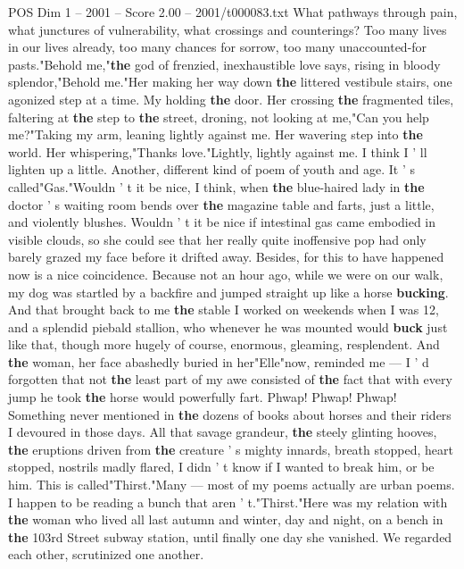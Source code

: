 \begin{textsample}{POS Dim 1 – 2001 – Score 2.00 – 2001/t000083.txt}
What pathways through pain, what junctures of vulnerability, what crossings and counterings?
Too many lives in our lives already, too many chances for sorrow, too many unaccounted-for pasts."Behold me,"\textbf{the} god of frenzied, inexhaustible love says, rising in bloody splendor,"Behold me."Her making her way down \textbf{the} littered vestibule stairs, one agonized step at a time.
My holding \textbf{the} door.
Her crossing \textbf{the} fragmented tiles, faltering at \textbf{the} step to \textbf{the} street, droning, not looking at me,"Can you help me?"Taking my arm, leaning lightly against me.
Her wavering step into \textbf{the} world.
Her whispering,"Thanks love."Lightly, lightly against me.
I think I ' ll lighten up a little.
Another, different kind of poem of youth and age.
It ' s called"Gas."Wouldn ' t it be nice, I think, when \textbf{the} blue-haired lady in \textbf{the} doctor ' s waiting room bends over \textbf{the} magazine table and farts, just a little, and violently blushes.
Wouldn ' t it be nice if intestinal gas came embodied in visible clouds, so she could see that her really quite inoffensive pop had only barely grazed my face before it drifted away.
Besides, for this to have happened now is a nice coincidence.
Because not an hour ago, while we were on our walk, my dog was startled by a backfire and jumped straight up like a horse \textbf{bucking}.
And that brought back to me \textbf{the} stable I worked on weekends when I was 12, and a splendid piebald stallion, who whenever he was mounted would \textbf{buck} just like that, though more hugely of course, enormous, gleaming, resplendent.
And \textbf{the} woman, her face abashedly buried in her"Elle"now, reminded me — I ' d forgotten that not \textbf{the} least part of my awe consisted of \textbf{the} fact that with every jump he took \textbf{the} horse would powerfully fart.
Phwap!
Phwap!
Phwap!
Something never mentioned in \textbf{the} dozens of books about horses and their riders I devoured in those days.
All that savage grandeur, \textbf{the} steely glinting hooves, \textbf{the} eruptions driven from \textbf{the} creature ' s mighty innards, breath stopped, heart stopped, nostrils madly flared, I didn ' t know if I wanted to break him, or be him.
This is called"Thirst."Many — most of my poems actually are urban poems.
I happen to be reading a bunch that aren ' t."Thirst."Here was my relation with \textbf{the} woman who lived all last autumn and winter, day and night, on a bench in \textbf{the} 103rd Street subway station, until finally one day she vanished.
We regarded each other, scrutinized one another.

\end{textsample}
